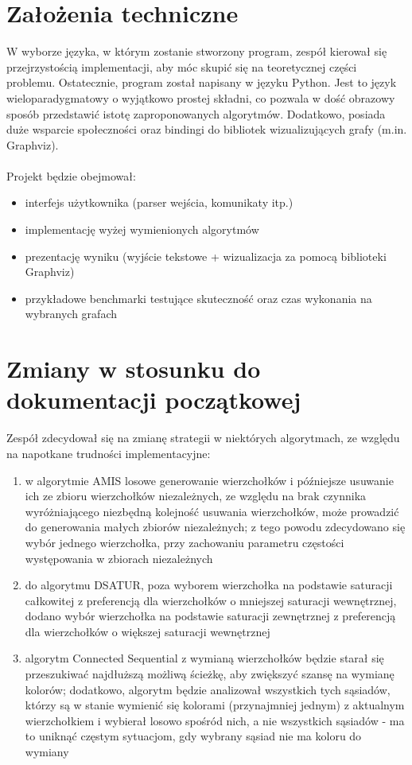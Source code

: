 \documentclass[10pt,a4paper]{article}
\begin{document}
	\section{Założenia techniczne}
	
	W wyborze języka, w którym zostanie stworzony program, zespół kierował się przejrzystością implementacji, aby móc skupić się na teoretycznej części problemu. Ostatecznie, program został napisany w języku Python. Jest to język wieloparadygmatowy o wyjątkowo prostej składni, co pozwala w dość obrazowy sposób przedstawić istotę zaproponowanych algorytmów. Dodatkowo, posiada duże wsparcie społeczności oraz bindingi do bibliotek wizualizujących grafy (m.in. Graphviz). 
	\\~\\
	Projekt będzie obejmował:
	\begin{itemize}
		\item interfejs użytkownika (parser wejścia, komunikaty itp.)
		\item implementację wyżej wymienionych algorytmów 
		\item prezentację wyniku (wyjście tekstowe + wizualizacja za pomocą biblioteki Graphviz)
		\item przykładowe benchmarki testujące skuteczność oraz czas wykonania na wybranych grafach
	\end{itemize}

	\section{Zmiany w stosunku do dokumentacji początkowej}
	
	Zespół zdecydował się na zmianę strategii w niektórych algorytmach, ze względu na napotkane trudności implementacyjne:
	\begin{enumerate}
		\item w algorytmie AMIS losowe generowanie wierzchołków i późniejsze usuwanie ich ze zbioru wierzchołków niezależnych, ze względu na brak czynnika wyróżniającego niezbędną kolejność usuwania wierzchołków, może prowadzić do generowania małych zbiorów niezależnych; z tego powodu zdecydowano się wybór jednego wierzchołka, przy zachowaniu parametru częstości występowania w zbiorach niezależnych
		\item do algorytmu DSATUR, poza wyborem wierzchołka na podstawie saturacji całkowitej z preferencją dla wierzchołków o mniejszej saturacji wewnętrznej, dodano wybór wierzchołka na podstawie saturacji zewnętrznej z preferencją dla wierzchołków o większej saturacji wewnętrznej
		\item algorytm Connected Sequential z wymianą wierzchołków będzie starał się przeszukiwać najdłuższą możliwą ścieżkę, aby zwiększyć szansę na wymianę kolorów; dodatkowo, algorytm będzie analizował wszystkich tych sąsiadów, którzy są w stanie wymienić się kolorami (przynajmniej jednym) z aktualnym wierzchołkiem i wybierał losowo spośród nich, a nie wszystkich sąsiadów - ma to uniknąć częstym sytuacjom, gdy wybrany sąsiad nie ma koloru do wymiany
	\end{enumerate}
	
\end{document}
